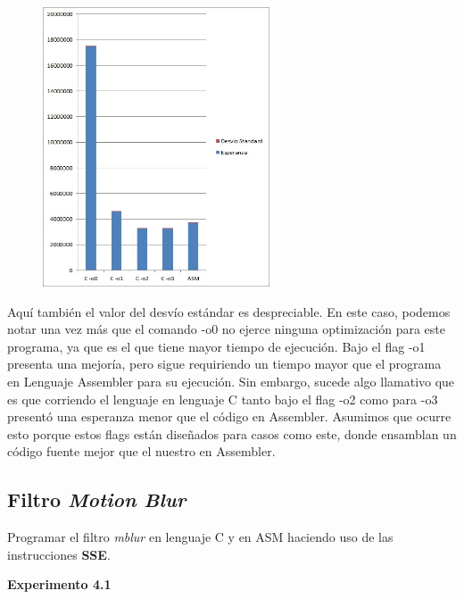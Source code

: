 \begin{figure}[h!]
  \begin{center}
	\includegraphics[width=0.6\textwidth]{imagenes/32.jpg}
  \end{center}
\end{figure}

Aqu\'i tambi\'en el valor del desv\'io est\'andar es despreciable. En este caso, podemos notar una vez m\'as que el comando -o0 no ejerce ninguna optimizaci\'on para este programa, ya que es el que tiene mayor tiempo de ejecuci\'on. Bajo el flag -o1 presenta una mejor\'ia, pero sigue requiriendo un tiempo mayor que el programa en Lenguaje Assembler para su ejecuci\'on. Sin embargo, sucede algo llamativo que es que corriendo el lenguaje en lenguaje C tanto bajo el flag -o2 como para -o3 present\'o una esperanza menor que el c\'odigo en Assembler. Asumimos que ocurre esto porque estos flags est\'an dise\~nados para casos como este, donde ensamblan un c\'odigo fuente mejor que el nuestro en Assembler.


\newpage
\subsection{Filtro \textit{Motion Blur}}
Programar el filtro \textit{mblur} en lenguaje C y en ASM haciendo uso de 
las instrucciones \textbf{SSE}.

\vspace*{0.3cm} \noindent
\textbf{Experimento 4.1}

